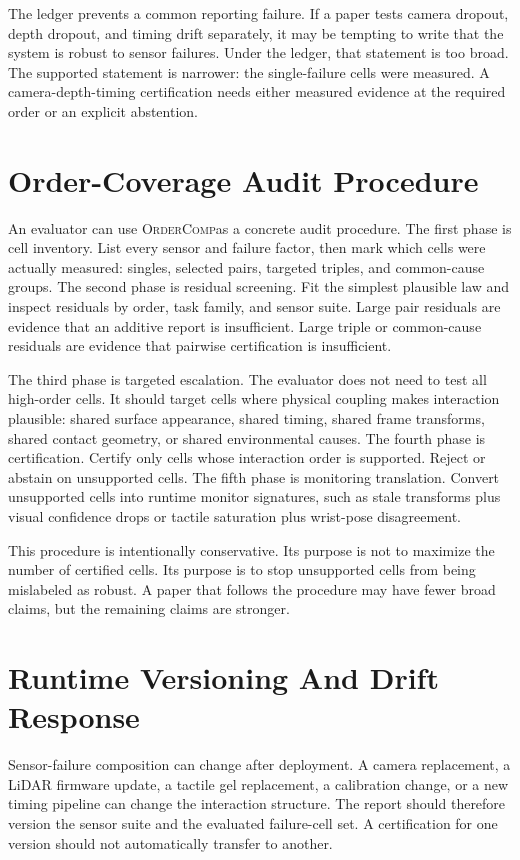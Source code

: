 \documentclass{article}
\newcommand{\method}{\textsc{OrderComp}}
\begin{document}
The ledger prevents a common reporting failure. If a paper tests camera dropout, depth dropout, and timing drift separately, it may be tempting to write that the system is robust to sensor failures. Under the ledger, that statement is too broad. The supported statement is narrower: the single-failure cells were measured. A camera-depth-timing certification needs either measured evidence at the required order or an explicit abstention.

\section{Order-Coverage Audit Procedure}

An evaluator can use \method as a concrete audit procedure. The first phase is cell inventory. List every sensor and failure factor, then mark which cells were actually measured: singles, selected pairs, targeted triples, and common-cause groups. The second phase is residual screening. Fit the simplest plausible law and inspect residuals by order, task family, and sensor suite. Large pair residuals are evidence that an additive report is insufficient. Large triple or common-cause residuals are evidence that pairwise certification is insufficient.

The third phase is targeted escalation. The evaluator does not need to test all high-order cells. It should target cells where physical coupling makes interaction plausible: shared surface appearance, shared timing, shared frame transforms, shared contact geometry, or shared environmental causes. The fourth phase is certification. Certify only cells whose interaction order is supported. Reject or abstain on unsupported cells. The fifth phase is monitoring translation. Convert unsupported cells into runtime monitor signatures, such as stale transforms plus visual confidence drops or tactile saturation plus wrist-pose disagreement.

This procedure is intentionally conservative. Its purpose is not to maximize the number of certified cells. Its purpose is to stop unsupported cells from being mislabeled as robust. A paper that follows the procedure may have fewer broad claims, but the remaining claims are stronger.

\section{Runtime Versioning And Drift Response}

Sensor-failure composition can change after deployment. A camera replacement, a LiDAR firmware update, a tactile gel replacement, a calibration change, or a new timing pipeline can change the interaction structure. The report should therefore version the sensor suite and the evaluated failure-cell set. A certification for one version should not automatically transfer to another.
\end{document}

